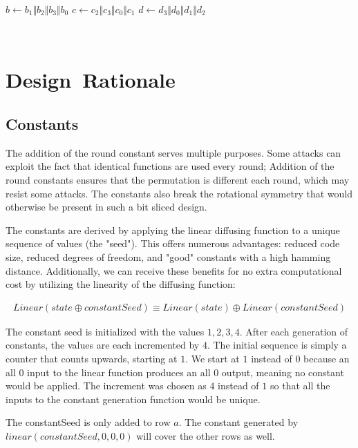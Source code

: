 \documentclass[preprint]{iacrtrans}
\begin{document}
\begin{algorithmic}
	\State $b \gets b_1 \Vert b_2 \Vert b_3 \Vert b_0$
	\State $c \gets c_2 \Vert c_3 \Vert c_0 \Vert c_1$	
	\State $d \gets d_3 \Vert d_0 \Vert d_1 \Vert d_2$
\EndFunction
\end{algorithmic}

\\

\section{Design\ Rationale}
\subsection{Constants}
The addition of the round constant serves multiple purposes. Some attacks can exploit the fact that identical functions are used every round; Addition of the round constants ensures that the permutation is different each round, which may resist some attacks. The constants also break the rotational symmetry that would otherwise be present in such a bit sliced design.

The constants are derived by applying the linear diffusing function to a unique sequence of values (the "seed"). This offers numerous advantages: reduced code size, reduced degrees of freedom, and "good" constants with a high hamming distance. Additionally, we can receive these benefits for no extra computational cost by utilizing the linearity of the diffusing function: 

\begin{align}
Linear(state \oplus constantSeed) \equiv Linear(state) \oplus Linear(constantSeed)
\end{align}

The constant seed is initialized with the values $1, 2, 3, 4$. After each generation of constants, the values are each incremented by $4$. The initial sequence is simply a counter that counts upwards, starting at $1$. We start at $1$ instead of $0$ because an all $0$ input to the linear function produces an all $0$ output, meaning no constant would be applied. The increment was chosen as $4$ instead of $1$ so that all the inputs to the constant generation function would be unique.

The constantSeed is only added to row $a$. The constant generated by $linear(constantSeed, 0, 0, 0)$ will cover the other rows as well.
\end{document}
